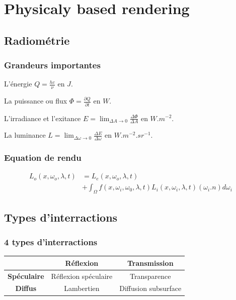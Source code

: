 \documentclass[handout]{beamer}
\begin{document}
\section{Physicaly based rendering}

\subsection{Radiométrie}

\begin{frame}

    \frametitle{Grandeurs importantes}

    L'énergie $ Q = \frac{hc}{\nu} $ en $ J $.

    La puissance ou flux $ \Phi = \frac{\partial Q}{\partial t} $ en $ W $.

    L'irradiance et l'exitance $ E = \lim_{\Delta A \to 0}  \frac{\Delta \Phi }{\Delta A} $ en $W.m^{-2} $.

    La luminance $ L = \lim_{\Delta \omega \to 0}  \frac{\Delta E }{\Delta \omega } $ en $ W.m^{-2}.sr^{-1} $.
\end{frame}

\begin{frame}

    \frametitle{Equation de rendu}

    \begin{align*}
        L_o(x, \omega_o, \lambda, t)
        &= L_e(x, \omega_o, \lambda, t) \\
        &+ \int_{\Omega}^{} f(x, \omega_i, \omega_0, \lambda, t)
        L_i(x, \omega_i, \lambda, t)
        (\omega_i . n) d\omega_i
    \end{align*}

\end{frame}

\subsection{Types d'interractions}

\begin{frame}

    \frametitle{4 types d'interractions}

    \begin{tabular}{ | c | c | c | }
        \hline
         & \bfseries Réflexion & \bfseries Transmission \\
        \hline
        \bfseries Spéculaire & Réflexion spéculaire & Transparence \\
        \hline
        \bfseries Diffus & Lambertien & Diffusion subsurface \\
        \hline
    \end{tabular}
    
\end{frame}
\end{document}
